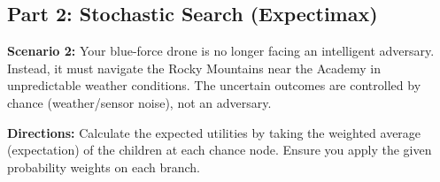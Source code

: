 \documentclass[11pt, letterpaper]{article}
\begin{document}
\newpage

\subsection*{Part 2: Stochastic Search (Expectimax)}

\noindent\textbf{Scenario 2:} Your blue-force drone is no longer facing an intelligent adversary. Instead, it must navigate the Rocky Mountains near the Academy in unpredictable weather conditions. The uncertain outcomes are controlled by chance (weather/sensor noise), not an adversary. 

\vspace{0.5em}
\noindent\textbf{Directions:} Calculate the expected utilities by taking the weighted average (expectation) of the children at each chance node. Ensure you apply the given probability weights on each branch.
\end{document}
